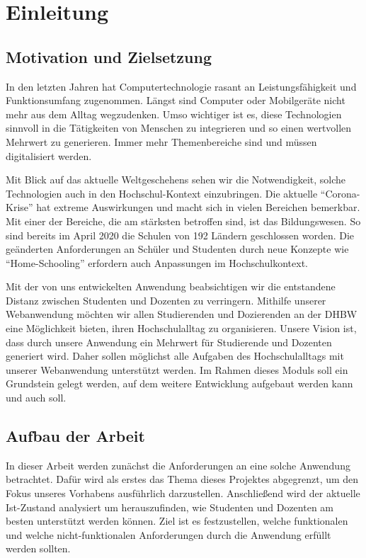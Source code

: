 \chapter{Einleitung}
\section{Motivation und Zielsetzung}
In den letzten Jahren hat Computertechnologie rasant an Leistungsfähigkeit und Funktionsumfang zugenommen.
Längst sind Computer oder Mobilgeräte nicht mehr aus dem Alltag wegzudenken.
Umso wichtiger ist es, diese Technologien sinnvoll in die Tätigkeiten von Menschen zu integrieren und so einen wertvollen Mehrwert zu generieren.
Immer mehr Themenbereiche sind und müssen digitalisiert werden.

Mit Blick auf das aktuelle Weltgeschehens sehen wir die Notwendigkeit, solche Technologien auch in den Hochschul-Kontext einzubringen.
Die aktuelle \enquote{Corona-Krise} hat extreme Auswirkungen und macht sich in vielen Bereichen bemerkbar.
Mit einer der Bereiche, die am stärksten betroffen sind, ist das Bildungswesen.
So sind bereits im April 2020 die Schulen von 192 Ländern geschlossen worden.\autocite[S. 845]{Donohue2020}
Die geänderten Anforderungen an Schüler und Studenten durch neue Konzepte wie \enquote{Home-Schooling} erfordern auch Anpassungen im Hochschulkontext.

Mit der von uns entwickelten Anwendung beabsichtigen wir die entstandene Distanz zwischen Studenten und Dozenten zu verringern. 
Mithilfe unserer Webanwendung möchten wir allen Studierenden und Dozierenden an der DHBW eine Möglichkeit bieten, ihren Hochschulalltag zu organisieren. 
Unsere Vision ist, dass durch unsere Anwendung ein Mehrwert für Studierende und Dozenten generiert wird.
Daher sollen möglichst alle Aufgaben des Hochschulalltags mit unserer Webanwendung unterstützt werden. 
Im Rahmen dieses Moduls soll ein Grundstein gelegt werden, auf dem weitere Entwicklung aufgebaut werden kann und auch soll.

\clearpage
\section{Aufbau der Arbeit} %
In dieser Arbeit werden zunächst die Anforderungen an eine solche Anwendung betrachtet.
Dafür wird als erstes das Thema dieses Projektes abgegrenzt, um den Fokus unseres Vorhabens ausführlich darzustellen.
Anschließend wird der aktuelle Ist-Zustand analysiert um herauszufinden, wie Studenten und Dozenten am besten unterstützt werden können.
Ziel ist es festzustellen, welche funktionalen und welche nicht-funktionalen Anforderungen durch die Anwendung erfüllt werden sollten.

